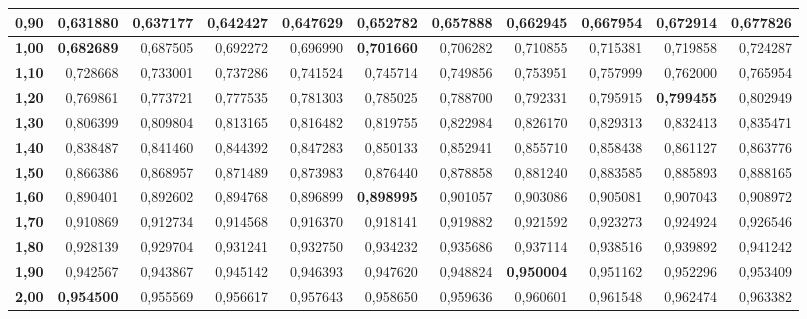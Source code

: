 \begin{tabular}{|r|rrrrr|rrrrr|}
{\bf 0,90} &   0,631880 &   0,637177 &   0,642427 &   0,647629 &   0,652782 &   0,657888 &   0,662945 &   0,667954 &   0,672914 &   0,677826 \\
\hline \hline
{\bf 1,00} & {\bf 0,682689} &   0,687505 &   0,692272 &   0,696990 & {\bf 0,701660} &   0,706282 &   0,710855 &   0,715381 &   0,719858 &   0,724287 \\

{\bf 1,10} &   0,728668 &   0,733001 &   0,737286 &   0,741524 &   0,745714 &   0,749856 &   0,753951 &   0,757999 &   0,762000 &   0,765954 \\

{\bf 1,20} &   0,769861 &   0,773721 &   0,777535 &   0,781303 &   0,785025 &   0,788700 &   0,792331 &   0,795915 & {\bf 0,799455} &   0,802949 \\

{\bf 1,30} &   0,806399 &   0,809804 &   0,813165 &   0,816482 &   0,819755 &   0,822984 &   0,826170 &   0,829313 &   0,832413 &   0,835471 \\

{\bf 1,40} &   0,838487 &   0,841460 &   0,844392 &   0,847283 &   0,850133 &   0,852941 &   0,855710 &   0,858438 &   0,861127 &   0,863776 \\
\hline
{\bf 1,50} &   0,866386 &   0,868957 &   0,871489 &   0,873983 &   0,876440 &   0,878858 &   0,881240 &   0,883585 &   0,885893 &   0,888165 \\

{\bf 1,60} &   0,890401 &   0,892602 &   0,894768 &   0,896899 & {\bf 0,898995} &   0,901057 &   0,903086 &   0,905081 &   0,907043 &   0,908972 \\

{\bf 1,70} &   0,910869 &   0,912734 &   0,914568 &   0,916370 &   0,918141 &   0,919882 &   0,921592 &   0,923273 &   0,924924 &   0,926546 \\

{\bf 1,80} &   0,928139 &   0,929704 &   0,931241 &   0,932750 &   0,934232 &   0,935686 &   0,937114 &   0,938516 &   0,939892 &   0,941242 \\

{\bf 1,90} &   0,942567 &   0,943867 &   0,945142 &   0,946393 &   0,947620 &   0,948824 & {\bf 0,950004} &   0,951162 &   0,952296 &   0,953409 \\
\hline \hline
{\bf 2,00} & {\bf 0,954500} &   0,955569 &   0,956617 &   0,957643 &   0,958650 &   0,959636 &   0,960601 &   0,961548 &   0,962474 &   0,963382 \\


\end{tabular}
